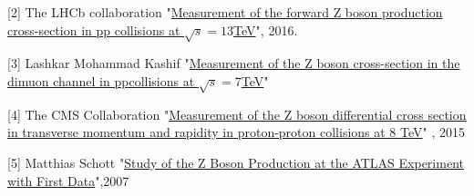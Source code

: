 \documentclass[12pt,a4paper]{article}		%
\begin{document}
[2] The LHCb collaboration "\href{https://arxiv.org/pdf/1607.06495.pdf}{Measurement of the forward Z boson production cross-section in pp collisions at $\sqrt{s} = 13$TeV}", 2016.


[3] Lashkar Mohammad Kashif "\href{http://lppc.physics.harvard.edu/files/lppc/files/kashif-2.pdf} {Measurement of the Z boson cross-section in the
	dimuon channel in ppcollisions at $\sqrt{s}= 7 $TeV}"

[4] The CMS Collaboration "\href{https://arxiv.org/pdf/1504.03511.pdf}{Measurement of the Z boson differential cross section in
	transverse momentum and rapidity in proton-proton
	collisions at 8 TeV}" , 2015

[5] Matthias Schott "\href{https://cds.cern.ch/record/2069156/files/Schott_Matthias.pdf}{Study of the Z Boson Production at the ATLAS Experiment with First Data}",2007




	
	
    
     
		
 

 
\end{document}
